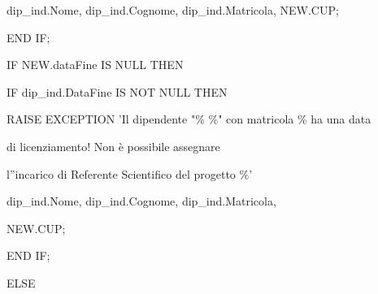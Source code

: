 \begin{flushleft}
\begin{description}
\begin{description}
\begin{description}
                        \item \hspace{3cm}dip\_ind.Nome, dip\_ind.Cognome, dip\_ind.Matricola, NEW.CUP;
                    \end{description}
                    \item END IF;
                    \item
                    \item IF NEW.dataFine IS NULL THEN
                    \vspace{0.2cm}
                    \begin{description}
                        \item IF dip\_ind.DataFine IS NOT NULL THEN
                        \vspace{0.2cm}
                        \begin{description}
                            \item RAISE EXCEPTION 'Il dipendente "\% \%" con matricola \% ha una data
                            \item \hspace{3cm}di licenziamento! Non è possibile assegnare
                            \item \hspace{3cm}l''incarico di Referente Scientifico del progetto \%'
                            \item \hspace{3cm}dip\_ind.Nome, dip\_ind.Cognome, dip\_ind.Matricola,
                            \item \hspace{3cm}NEW.CUP;
                        \end{description}
                        \item END IF;
                    \end{description}
                    \item ELSE
                    
                    \newpage


\end{description}
\end{description}
\end{flushleft}
